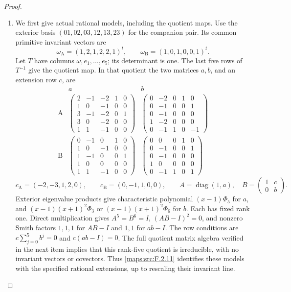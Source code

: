 \documentclass[11pt,a4paper]{article}
\theoremstyle{definition}
\begin{document}
\begin{proof}
\begin{enumerate}[label=\arabic*.]
\item We first give actual rational models, including the quotient
maps.  Use the exterior basis $(01,02,03,12,13,23)$ for the companion
pair.  Its common primitive invariant vectors are
\[
 \omega_{\mathrm A}=(1,2,1,2,2,1)^t,\qquad
 \omega_{\mathrm B}=(1,0,1,0,0,1)^t.
\]
Let $T$ have columns $\omega,e_1,\ldots,e_5$; its determinant is one.
The last five rows of $T^{-1}$ give the quotient map.  In that
quotient the two matrices $a,b$, and an extension row $c$, are
\[
\begin{array}{c|c|c}
 &a&b\\\hline
\mathrm A&
\begin{pmatrix}2&-1&-2&1&0\\1&0&-1&0&0\\3&-1&-2&0&1\\
3&0&-2&0&0\\1&1&-1&0&0\end{pmatrix}&
\begin{pmatrix}0&-2&0&1&0\\0&-1&0&0&1\\0&-1&0&0&0\\
1&-2&0&0&0\\0&-1&1&0&-1\end{pmatrix}\\[3pt]
\mathrm B&
\begin{pmatrix}0&-1&0&1&0\\1&0&-1&0&0\\1&-1&0&0&1\\
1&0&0&0&0\\1&1&-1&0&0\end{pmatrix}&
\begin{pmatrix}0&0&0&1&0\\0&-1&0&0&1\\0&-1&0&0&0\\
1&0&0&0&0\\0&-1&1&0&1\end{pmatrix}
\end{array}
\]
\[
 c_{\mathrm A}=(-2,-3,1,2,0),\qquad
 c_{\mathrm B}=(0,-1,1,0,0),\qquad
 A=\operatorname{diag}(1,a),\quad
 B=\begin{pmatrix}1&c\\0&b\end{pmatrix}.
\]
Exterior eigenvalue products give characteristic polynomial
$(x-1)\Phi _5$ for $a$, and $(x-1)(x+1)^2\Phi _3$ or
$(x-1)(x+1)^2\Phi _6$ for $b$.  Each has fixed rank one.
Direct multiplication gives $A^5=B^6=I$, $(AB-I)^2=0$, and
nonzero Smith factors $1,1,1$ for $AB-I$ and $1,1$ for $ab-I$.
The row conditions are $c\sum_{j=0}^5b^j=0$ and $c(ab-I)=0$.
The full quotient matrix algebra verified in the next item implies
that this rank-five quotient is irreducible, with no invariant
vectors or covectors.  Thus \cref{maps:src:F.2.11} identifies these
models with the specified rational extensions, up to rescaling
their invariant line.


\end{enumerate}
\end{proof}
\end{document}
